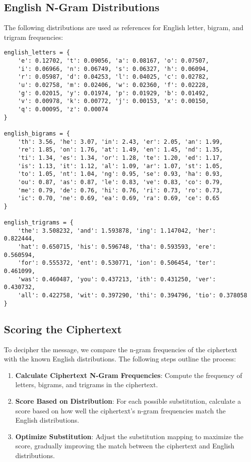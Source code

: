\documentclass[12pt]{article}
\begin{document}
\subsection{English N-Gram Distributions}
The following distributions are used as references for English letter, bigram, and trigram frequencies:

\begin{verbatim}
english_letters = {
	'e': 0.12702, 't': 0.09056, 'a': 0.08167, 'o': 0.07507,
	'i': 0.06966, 'n': 0.06749, 's': 0.06327, 'h': 0.06094,
	'r': 0.05987, 'd': 0.04253, 'l': 0.04025, 'c': 0.02782,
	'u': 0.02758, 'm': 0.02406, 'w': 0.02360, 'f': 0.02228,
	'g': 0.02015, 'y': 0.01974, 'p': 0.01929, 'b': 0.01492,
	'v': 0.00978, 'k': 0.00772, 'j': 0.00153, 'x': 0.00150,
	'q': 0.00095, 'z': 0.00074
}

english_bigrams = {
	'th': 3.56, 'he': 3.07, 'in': 2.43, 'er': 2.05, 'an': 1.99,
	're': 1.85, 'on': 1.76, 'at': 1.49, 'en': 1.45, 'nd': 1.35,
	'ti': 1.34, 'es': 1.34, 'or': 1.28, 'te': 1.20, 'ed': 1.17,
	'is': 1.13, 'it': 1.12, 'al': 1.09, 'ar': 1.07, 'st': 1.05,
	'to': 1.05, 'nt': 1.04, 'ng': 0.95, 'se': 0.93, 'ha': 0.93,
	'ou': 0.87, 'as': 0.87, 'le': 0.83, 've': 0.83, 'co': 0.79,
	'me': 0.79, 'de': 0.76, 'hi': 0.76, 'ri': 0.73, 'ro': 0.73,
	'ic': 0.70, 'ne': 0.69, 'ea': 0.69, 'ra': 0.69, 'ce': 0.65
}

english_trigrams = {
	'the': 3.508232, 'and': 1.593878, 'ing': 1.147042, 'her': 0.822444,
	'hat': 0.650715, 'his': 0.596748, 'tha': 0.593593, 'ere': 0.560594,
	'for': 0.555372, 'ent': 0.530771, 'ion': 0.506454, 'ter': 0.461099,
	'was': 0.460487, 'you': 0.437213, 'ith': 0.431250, 'ver': 0.430732,
	'all': 0.422758, 'wit': 0.397290, 'thi': 0.394796, 'tio': 0.378058
}
\end{verbatim}

\subsection{Scoring the Ciphertext}
To decipher the message, we compare the n-gram frequencies of the ciphertext with the known English distributions. The following steps outline the process:

\begin{enumerate}
	\item \textbf{Calculate Ciphertext N-Gram Frequencies}: Compute the frequency of letters, bigrams, and trigrams in the ciphertext.
	\item \textbf{Score Based on Distribution}: For each possible substitution, calculate a score based on how well the ciphertext's n-gram frequencies match the English distributions.
	\item \textbf{Optimize Substitution}: Adjust the substitution mapping to maximize the score, gradually improving the match between the ciphertext and English distributions.
\end{enumerate}
\end{document}
